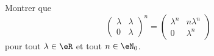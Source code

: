 \begin{exercice}\label{exoLineraire0010}

Montrer que
\begin{equation}
	\begin{pmatrix}
	\lambda	&	\lambda	\\ 
	0	&	\lambda	
\end{pmatrix}^n=
\begin{pmatrix}
	\lambda^n	&	n\lambda^n	\\ 
	0	&	\lambda^n	
\end{pmatrix}
\end{equation}
pour tout $\lambda\in\eR$ et tout $n\in\eN_0$.

\end{exercice}
